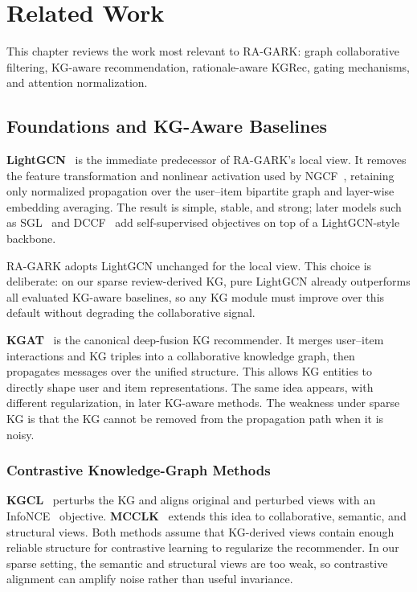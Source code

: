 \chapter{Related Work}
\label{ch:relatedwork}

This chapter reviews the work most relevant to RA-GARK: graph collaborative filtering, KG-aware recommendation, rationale-aware KGRec, gating mechanisms, and attention normalization.

\section{Foundations and KG-Aware Baselines}
\label{sec:rw-foundations}

\textbf{LightGCN}~\cite{he2020lightgcn} is the immediate predecessor of RA-GARK's local view. It removes the feature transformation and nonlinear activation used by NGCF~\cite{wang2019ngcf}, retaining only normalized propagation over the user--item bipartite graph and layer-wise embedding averaging. The result is simple, stable, and strong; later models such as SGL~\cite{wu2021sgl} and DCCF~\cite{ren2023dccf} add self-supervised objectives on top of a LightGCN-style backbone.

RA-GARK adopts LightGCN unchanged for the local view. This choice is deliberate: on our sparse review-derived KG, pure LightGCN already outperforms all evaluated KG-aware baselines, so any KG module must improve over this default without degrading the collaborative signal.

\textbf{KGAT}~\cite{wang2019kgat} is the canonical deep-fusion KG recommender. It merges user--item interactions and KG triples into a collaborative knowledge graph, then propagates messages over the unified structure. This allows KG entities to directly shape user and item representations. The same idea appears, with different regularization, in later KG-aware methods. The weakness under sparse KG is that the KG cannot be removed from the propagation path when it is noisy.

\subsection{Contrastive Knowledge-Graph Methods}
\label{sec:rw-contrastive}

\textbf{KGCL}~\cite{yang2022kgcl} perturbs the KG and aligns original and perturbed views with an InfoNCE~\cite{oord2018infonce} objective. \textbf{MCCLK}~\cite{zou2022mcclk} extends this idea to collaborative, semantic, and structural views. Both methods assume that KG-derived views contain enough reliable structure for contrastive learning to regularize the recommender. In our sparse setting, the semantic and structural views are too weak, so contrastive alignment can amplify noise rather than useful invariance.

